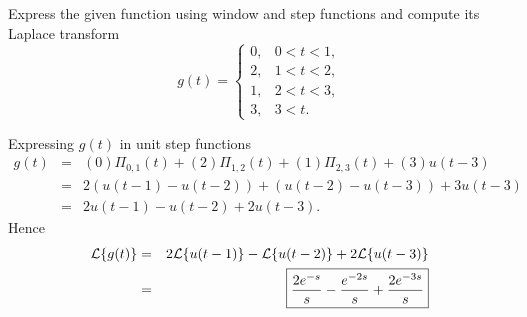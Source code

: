 \documentclass[11pt]{article}
\begin{document}
\begin{problem}
Express the given function using window and step functions and compute its Laplace transform
\begin{equation*}
g(t) = \begin{cases}
0, & 0<t<1, \\
2, & 1<t<2, \\
1, & 2<t<3, \\
3, & 3<t.
\end{cases}
\end{equation*}
\end{problem}
\begin{solution}
Expressing $g(t)$ in unit step functions
\begin{eqnarray*}
g(t) & = & (0) \Pi_{0,1}(t) + (2)\Pi_{1,2}(t) + (1)\Pi_{2,3}(t) + (3) u(t-3) \\
& = & 2(u(t-1)-u(t-2)) + (u(t-2)-u(t-3)) + 3 u(t-3) \\
& = & 2u(t-1)-u(t-2)+2 u(t-3).
\end{eqnarray*}
Hence
\begin{eqnarray*}
{\cal L}\{ g(t) \} & = & 2{\cal L}\{ u(t-1) \}-{\cal L}\{ u(t-2) \} +2{\cal L}\{ u(t-3) \} \\
     & = & \boxed{\dfrac{2e^{-s}}{s}-\dfrac{e^{-2s}}{s} +\dfrac{2e^{-3s}}{s}}
\end{eqnarray*}
\end{solution}
\end{document}
